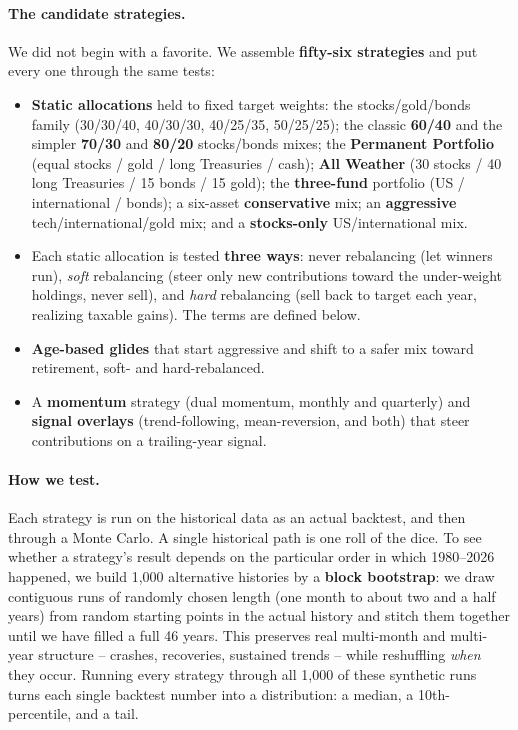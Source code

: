 \documentclass[11pt]{article}
\begin{document}
\paragraph{The candidate strategies.} We did not begin with a favorite. We assemble \textbf{fifty-six
strategies} and put every one through the same tests:
\begin{itemize}
\item \textbf{Static allocations} held to fixed target weights: the stocks/gold/bonds family
(30/30/40, 40/30/30, 40/25/35, 50/25/25); the classic \textbf{60/40} and the simpler \textbf{70/30}
and \textbf{80/20} stocks/bonds mixes; the \textbf{Permanent Portfolio} (equal stocks / gold / long
Treasuries / cash); \textbf{All Weather} (30 stocks / 40 long Treasuries / 15 bonds / 15 gold); the
\textbf{three-fund} portfolio (US / international / bonds); a six-asset \textbf{conservative} mix; an
\textbf{aggressive} tech/international/gold mix; and a \textbf{stocks-only} US/international mix.
\item Each static allocation is tested \textbf{three ways}: never rebalancing (let winners run),
\emph{soft} rebalancing (steer only new contributions toward the under-weight holdings, never sell), and
\emph{hard} rebalancing (sell back to target each year, realizing taxable gains). The terms are
defined below.
\item \textbf{Age-based glides} that start aggressive and shift to a safer mix toward retirement,
soft- and hard-rebalanced.
\item A \textbf{momentum} strategy (dual momentum, monthly and quarterly) and \textbf{signal overlays}
(trend-following, mean-reversion, and both) that steer contributions on a trailing-year signal.
\end{itemize}

\paragraph{How we test.} Each strategy is run on the historical data as an actual backtest, and then
through a Monte Carlo. A single historical path is one roll of the dice. To see whether a strategy's
result depends on the particular order in which 1980--2026 happened, we build 1{,}000 alternative
histories by a \textbf{block bootstrap}: we draw contiguous runs of randomly chosen length (one month to
about two and a half years) from random starting points in the actual history and stitch them together
until we have filled a full 46 years. This preserves real multi-month and multi-year structure --
crashes, recoveries, sustained trends -- while reshuffling \emph{when} they occur. Running every strategy
through all 1{,}000 of these synthetic runs turns each single backtest number into a distribution: a
median, a 10th-percentile, and a tail.
\end{document}
